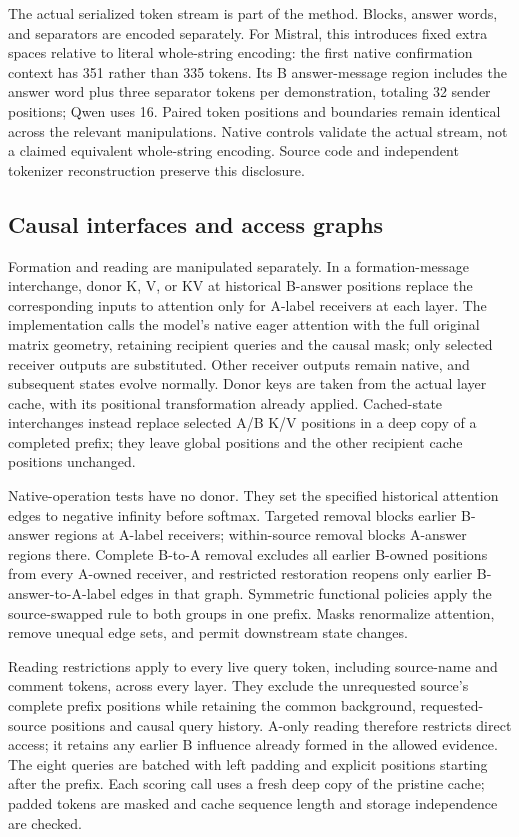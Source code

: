 \documentclass[11pt]{article}
\begin{document}
The actual serialized token stream is part of the method. Blocks, answer words, and separators are encoded separately. For Mistral, this introduces fixed extra spaces relative to literal whole-string encoding: the first native confirmation context has 351 rather than 335 tokens. Its B answer-message region includes the answer word plus three separator tokens per demonstration, totaling 32 sender positions; Qwen uses 16. Paired token positions and boundaries remain identical across the relevant manipulations. Native controls validate the actual stream, not a claimed equivalent whole-string encoding. Source code and independent tokenizer reconstruction preserve this disclosure.

\subsection{Causal interfaces and access graphs}\label{causal-interfaces-and-access-graphs}

Formation and reading are manipulated separately. In a formation-message interchange, donor K, V, or KV at historical B-answer positions replace the corresponding inputs to attention only for A-label receivers at each layer. The implementation calls the model's native eager attention with the full original matrix geometry, retaining recipient queries and the causal mask; only selected receiver outputs are substituted. Other receiver outputs remain native, and subsequent states evolve normally. Donor keys are taken from the actual layer cache, with its positional transformation already applied. Cached-state interchanges instead replace selected A/B K/V positions in a deep copy of a completed prefix; they leave global positions and the other recipient cache positions unchanged.

Native-operation tests have no donor. They set the specified historical attention edges to negative infinity before softmax. Targeted removal blocks earlier B-answer regions at A-label receivers; within-source removal blocks A-answer regions there. Complete B-to-A removal excludes all earlier B-owned positions from every A-owned receiver, and restricted restoration reopens only earlier B-answer-to-A-label edges in that graph. Symmetric functional policies apply the source-swapped rule to both groups in one prefix. Masks renormalize attention, remove unequal edge sets, and permit downstream state changes.

Reading restrictions apply to every live query token, including source-name and comment tokens, across every layer. They exclude the unrequested source's complete prefix positions while retaining the common background, requested-source positions and causal query history. A-only reading therefore restricts direct access; it retains any earlier B influence already formed in the allowed evidence. The eight queries are batched with left padding and explicit positions starting after the prefix. Each scoring call uses a fresh deep copy of the pristine cache; padded tokens are masked and cache sequence length and storage independence are checked.
\end{document}
